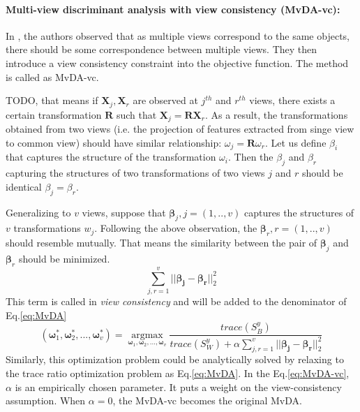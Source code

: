     \paragraph{Multi-view discriminant analysis with view consistency (MvDA-vc):}
    In \cite{kan2016multi}, the authors observed that as multiple views correspond to the same objects, there should be some correspondence between multiple views. They then introduce a view consistency constraint into the objective function. The method is called as MvDA-vc. %
    
    
    TODO, that means if $\boldsymbol{X}_j, \boldsymbol{X}_r$ are observed at $j^{th}$ and $r^{th}$ views, there exists a certain transformation $\boldsymbol{R}$ such that $\boldsymbol{X}_j = \boldsymbol{R}\boldsymbol{X}_r$. As a result, the transformations obtained from two views (i.e. the projection of features extracted from singe view to common view) should have similar relationship: ${\omega}_j = \boldsymbol{R}{\omega}_r$. Let us define $\beta_i$ that captures the structure of the transformation ${\omega}_i$. Then the $\beta_j$ and $\beta_r$ capturing the structures of two transformations of two views $j$ and $r$ should be identical ${\beta}_j = {\beta}_r$.
    
    Generalizing to $v$ views, suppose that ${\boldsymbol\beta}_j, j=(1,..,v)$ captures the structures of $v$ transformations ${w}_j$. Following the above observation, the $\boldsymbol{\beta}_r, r=(1,..,v)$ should resemble mutually. That means the similarity between the pair of $\boldsymbol{\beta}_j$ and $\boldsymbol{\beta}_r$ should be minimized. 
    \begin{equation}
         \sum_{j,r=1}^{v}||\boldsymbol{\beta_j} - \boldsymbol{\beta_r}||_2^2
    \end{equation}
     This term is called in \cite{kan2016multi} {\itshape view consistency} and will be added to the denominator of Eq.\eqref{eq:MvDA}
    \begin{equation}
        (\boldsymbol{\omega}_1^*,\boldsymbol{\omega}_2^*, ..., \boldsymbol{\omega}_v^*) = \operatorname*{argmax}_{\boldsymbol{\omega}_1, \boldsymbol{\omega}_2,..., \boldsymbol{\omega}_v}\frac{trace({S}_B^y)}{trace({S}_W^y) + \alpha\sum_{j,r=1}^{v}||\boldsymbol{\beta_j} - \boldsymbol{\beta_r}||_2^2} 
        \label{eq:MvDA-vc}
    \end{equation}
    Similarly, this optimization problem could be analytically solved by relaxing to the trace ratio optimization problem as Eq.\eqref{eq:MvDA}. In the Eq.\eqref{eq:MvDA-vc}, $\alpha$ is an empirically chosen parameter. It puts a weight on the view-consistency assumption. When $\alpha = 0$, the MvDA-vc becomes the original MvDA. 
